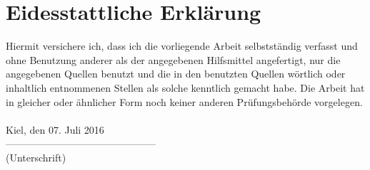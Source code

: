 \chapter{Eidesstattliche Erklärung}
\label{sec:erklaerung}

Hiermit versichere ich, dass ich die vorliegende Arbeit selbstständig verfasst und ohne Benutzung
anderer als der angegebenen Hilfsmittel angefertigt, nur die angegebenen Quellen benutzt und die
in den benutzten Quellen wörtlich oder inhaltlich entnommenen Stellen als solche kenntlich
gemacht habe.
Die Arbeit hat in gleicher oder ähnlicher Form noch keiner anderen Prüfungsbehörde vorgelegen.\\
\\[1.5cm]
Kiel, den 07. Juli 2016
\\[2cm]
---------------------------------------------
\\
\enspace (Unterschrift)

\iffalse
\newpage
\addsec{Danksagungen}
\label{danksagungen}
Weit hinten, hinter den Wortbergen, fern der Länder Vokalien und Konsonantien leben die Blindtexte. Abgeschieden wohnen Sie in Buchstabhausen an der Küste des Semantik, eines großen Sprachozeans. Ein kleines Bächlein namens Duden fließt durch ihren Ort und versorgt sie mit den nötigen Regelialien. Es ist ein paradiesmatisches Land, in dem einem gebratene Satzteile in den Mund fliegen. Nicht einmal von der allmächtigen Interpunktion werden die Blindtexte beherrscht – ein geradezu unorthographisches Leben. Eines Tages aber beschloß eine kleine Zeile Blindtext, ihr Name war Lorem Ipsum, hinaus zu gehen in die weite Grammatik. Der große Oxmox riet ihr davon ab, da.
\fi
